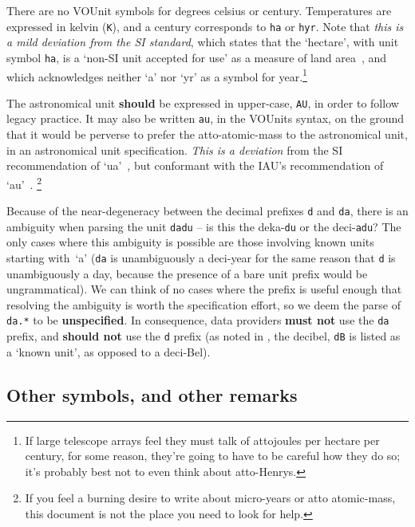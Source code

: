 \documentclass[11pt,a4paper]{ivoa}
\newcommand{\unit}[1]{\texttt{\small\color{orange}#1}}
\newcommand*\norm[1]{\textbf{\color{ivoacolor}#1}}
\begin{document}
There are no VOUnit symbols for degrees celsius or century.
Temperatures are expressed in kelvin (\unit{K}),
and a century corresponds to \unit{ha} or \unit{hyr}.
Note that \emph{this is a mild deviation from the SI standard},
which states that the `hectare', with unit symbol \unit{ha},
is a `non-SI unit accepted for use' as a measure of land area~\citep[table~6]{si-brochure},
and which acknowledges neither `a' nor `yr' as a symbol for year.\footnote{If
large telescope arrays feel they must talk of attojoules per
hectare per century, for some reason, they're going to have to be
careful how they do so; it's probably best not to even think about atto-Henrys.}

The astronomical unit \norm{should} be expressed in upper-case, \unit{AU}, in
order to follow legacy practice.  It may also be written \unit{au}, in
the VOUnits syntax, on the ground that it would be perverse to prefer
the atto-atomic-mass to the astronomical unit, in an astronomical unit
specification.
\emph{This is a deviation} from the SI recommendation of
`ua'~\citep[Table 7]{si-brochure}, but conformant with the IAU's
recommendation of `au'~\citep{iau12}.%
\footnote{If you feel a burning desire to write about micro-years or
atto atomic-mass, this document is not the place you need to look
for help.}

Because of the near-degeneracy between the decimal prefixes \texttt{d}
and \texttt{da}, there is an ambiguity when parsing the
unit \unit{dadu} -- is this the deka-\unit{du} or the deci-\unit{adu}?
The only cases where this ambiguity is possible are those involving
known units starting with~`a' (\texttt{da} is unambiguously a
deci-year for the same reason that \texttt{d} is unambiguously a day,
because the presence of a bare unit prefix would be ungrammatical).
We can think of no cases where the prefix is useful enough that
resolving the ambiguity is worth the specification effort, so we deem
the parse of \texttt{da.*} to be \textbf{unspecified}. %
In consequence, data providers \norm{must not} use the \texttt{da}
prefix, and \norm{should not} use the \texttt d prefix (as noted
in , the decibel, \unit{dB} is listed as a `known
unit', as opposed to a deci-Bel).

\subsection{Other symbols, and other remarks\label{sec:other}}
\end{document}
